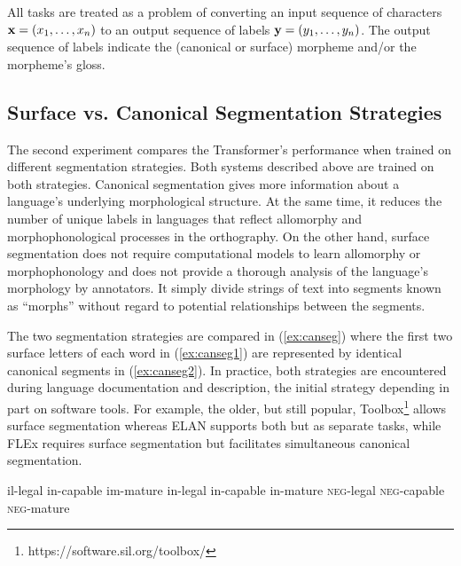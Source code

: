 All tasks are treated as a problem of converting an input sequence of characters $\mathbf{x} = (x_1, \ldots, x_n)$ to an output sequence of labels $\mathbf{y} = (y_1, \ldots, y_n)$. The output sequence of labels indicate the (canonical or surface) morpheme and/or the morpheme's gloss. 

\subsection{Surface vs. Canonical Segmentation Strategies}
\label{sec:strategies}

The second experiment compares the Transformer's performance when trained on different segmentation strategies. Both systems described above are trained on both strategies. Canonical segmentation gives more information about a language's underlying morphological structure. At the same time, it reduces the number of unique labels in languages that reflect allomorphy and morphophonological processes in the orthography. On the other hand, surface segmentation does not require computational models to learn allomorphy or morphophonology \citep{goldsmith_computational_2017} and does not provide a thorough analysis of the language's morphology by annotators. It simply divide strings of text into segments known as ``morphs'' \citep{virpioja_empirical_2011} without regard to potential relationships between the segments. 

The two segmentation strategies are compared in (\ref{ex:canseg}) where the first two surface letters of each word in (\ref{ex:canseg1}) are represented by identical canonical segments in (\ref{ex:canseg2}).%
In practice, both strategies are encountered during language documentation and description, the initial strategy depending in part on software tools. For example, the older, but still popular, Toolbox\footnote{https://software.sil.org/toolbox/} allows surface segmentation whereas ELAN \citep{auer_elan_2010} supports both but as separate tasks, while FLEx \citep{baines_overview_2018} requires surface segmentation but facilitates simultaneous canonical segmentation. 


\pex   
\label{ex:canseg}
\a il-legal \hspace{6mm} in-capable \hspace{5mm} im-mature
\label{ex:canseg1}
\a in-legal \hspace{5mm} in-capable \hspace{5mm} in-mature
\label{ex:canseg2}
\a \textsc{neg}-legal \hspace{1mm} \textsc{neg}-capable \hspace{1mm} \textsc{neg}-mature
\label{ex:canseg3}
\xe


